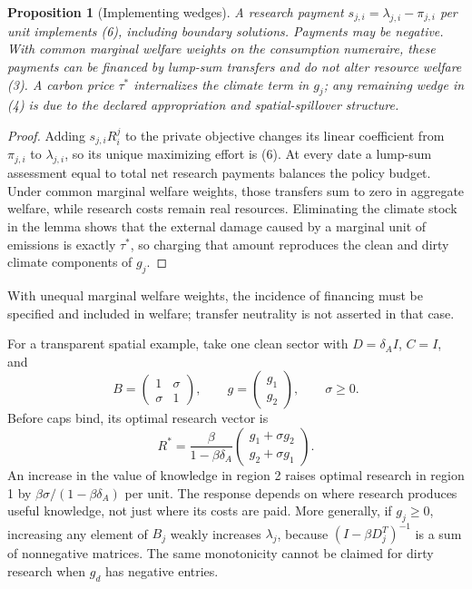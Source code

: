\documentclass[11pt,a4paper]{article}
\newtheorem{proposition}[theorem]{Proposition}
\theoremstyle{definition}
\theoremstyle{remark}
\begin{document}
\begin{proposition}[Implementing wedges]
A research payment $s_{j,i}=\lambda_{j,i}-\pi_{j,i}$ per unit implements (6), including boundary solutions. Payments may be negative. With common marginal welfare weights on the consumption numeraire, these payments can be financed by lump-sum transfers and do not alter resource welfare (3). A carbon price $\tau^*$ internalizes the climate term in $g_j$; any remaining wedge in (4) is due to the declared appropriation and spatial-spillover structure.
\end{proposition}
\begin{proof}
Adding $s_{j,i}R_i^j$ to the private objective changes its linear coefficient from $\pi_{j,i}$ to $\lambda_{j,i}$, so its unique maximizing effort is (6). At every date a lump-sum assessment equal to total net research payments balances the policy budget. Under common marginal welfare weights, those transfers sum to zero in aggregate welfare, while research costs remain real resources. Eliminating the climate stock in the lemma shows that the external damage caused by a marginal unit of emissions is exactly $\tau^*$, so charging that amount reproduces the clean and dirty climate components of $g_j$.
\end{proof}

With unequal marginal welfare weights, the incidence of financing must be specified and included in welfare; transfer neutrality is not asserted in that case.

For a transparent spatial example, take one clean sector with $D=\delta_A I$, $C=I$, and
\[
 B=\begin{pmatrix}1&\sigma\\ \sigma&1\end{pmatrix},
 \qquad g=\begin{pmatrix}g_1\\g_2\end{pmatrix},
 \qquad \sigma\ge0.
\]
Before caps bind, its optimal research vector is
\[
 R^*=\frac\beta{1-\beta\delta_A}
           \begin{pmatrix}g_1+\sigma g_2\\g_2+\sigma g_1\end{pmatrix}.
\]
An increase in the value of knowledge in region 2 raises optimal research in region 1 by $\beta\sigma/(1-\beta\delta_A)$ per unit. The response depends on where research produces useful knowledge, not just where its costs are paid. More generally, if $g_j\ge0$, increasing any element of $B_j$ weakly increases $\lambda_j$, because $(I-\beta D_j^T)^{-1}$ is a sum of nonnegative matrices. The same monotonicity cannot be claimed for dirty research when $g_d$ has negative entries.
\end{document}
